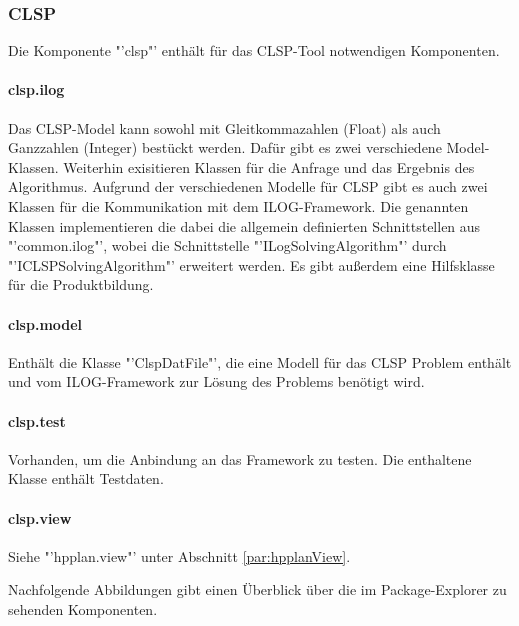 \documentclass[12pt,a4paper, listof=entryprefix, bibliography=totocnumbered,toc=listofnumbered,lof=listofnumbered]{scrartcl}
\begin{document}
\subsubsection{CLSP}
Die Komponente "'clsp"' enthält für das CLSP-Tool notwendigen Komponenten.

\paragraph{clsp.ilog}
Das CLSP-Model kann sowohl mit Gleitkommazahlen (Float) als auch Ganzzahlen (Integer) bestückt werden. Dafür gibt es zwei verschiedene Model-Klassen. Weiterhin exisitieren Klassen für die Anfrage und das Ergebnis des Algorithmus. Aufgrund der verschiedenen Modelle für CLSP gibt es auch zwei Klassen für die Kommunikation mit dem ILOG-Framework. Die genannten Klassen implementieren die dabei die allgemein definierten Schnittstellen aus "'common.ilog"', wobei die Schnittstelle "'ILogSolvingAlgorithm"' durch "'ICLSPSolvingAlgorithm"' erweitert werden. Es gibt außerdem eine Hilfsklasse für die Produktbildung.


\paragraph{clsp.model}
Enthält die Klasse "'ClspDatFile"', die eine Modell für das CLSP Problem enthält und vom ILOG-Framework zur Lösung des Problems benötigt wird.

\paragraph{clsp.test}
Vorhanden, um die Anbindung an das Framework zu testen. Die enthaltene Klasse enthält Testdaten.

\paragraph{clsp.view}
Siehe "'hpplan.view"' unter Abschnitt \ref{par:hpplanView}.


Nachfolgende Abbildungen gibt einen Überblick über die im Package-Explorer zu sehenden Komponenten. 
\end{document}
